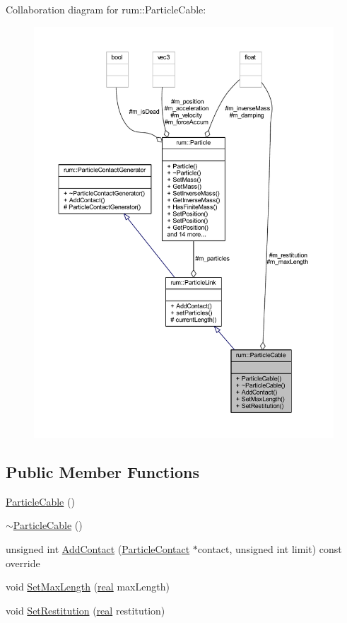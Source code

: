 Collaboration diagram for rum\+:\+:Particle\+Cable\+:\nopagebreak
\begin{figure}[H]
\begin{center}
\leavevmode
\includegraphics[width=350pt]{classrum_1_1_particle_cable__coll__graph}
\end{center}
\end{figure}
\subsection*{Public Member Functions}
\begin{DoxyCompactItemize}
\item 
\hyperlink{classrum_1_1_particle_cable_ad2b529c1d51b6af9f3c2e7f535e64c0c}{Particle\+Cable} ()
\item 
\hyperlink{classrum_1_1_particle_cable_aac2552bf3ddefc5c59fd7953a719b43a}{$\sim$\+Particle\+Cable} ()
\item 
unsigned int \hyperlink{classrum_1_1_particle_cable_a06c6184b7e1d6047db4f732b132fb329}{Add\+Contact} (\hyperlink{classrum_1_1_particle_contact}{Particle\+Contact} $\ast$contact, unsigned int limit) const override
\item 
void \hyperlink{classrum_1_1_particle_cable_a24400de0c86bf3ec7dfe61b48090d0a1}{Set\+Max\+Length} (\hyperlink{namespacerum_a7e8cca23573d5eaead0f138cbaa4862c}{real} max\+Length)
\item 
void \hyperlink{classrum_1_1_particle_cable_af6996d42d05186d34ca0db7c2ea766ff}{Set\+Restitution} (\hyperlink{namespacerum_a7e8cca23573d5eaead0f138cbaa4862c}{real} restitution)
\end{DoxyCompactItemize}
